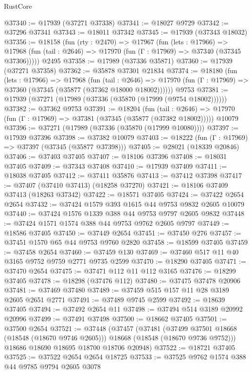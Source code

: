 \begin{lexlean}{RustCore}
\begin{coremodule}
@37340 := @17939 (@37271 @37338)
@37341 := @18027 @9729
@37342 := @37296 @37341
@37343 := @18011 @37342
@37345 := @17939 (@37343 @18032)
@37356 := @18158
    (fun (rty : @2470) =>
    @17967
      (fun (lets : @17966) =>
      @17968 (fun (tail : @2646) => @17970 (fun (Γ : @17969) => @37340 (@37345 @37306)))))
    @2495
@37358 := @17989 (@37336 @35871)
@37360 := @17939 (@37271 @37358)
@37362 := @35878 @37301 @21834
@37374 := @18180
    (fun (lets : @17966) =>
    @17968
      (fun (tail : @2646) =>
      @17970 (fun (Γ : @17969) => @37360 (@37345 (@35877 (@37362 @18000 @18002))))))
    @9753
@37381 := @17939 (@37271 (@17989 (@37336 (@35870 (@17999 (@9754 @18002))))))
@37382 := @37362 @9753
@37391 := @18204
    (fun (tail : @2646) => @17970 (fun (Γ : @17969) => @37381 (@37345 (@35877 (@37382 @18002)))))
    @10079
@37396 := @37271 (@17989 (@37336 (@35870 (@17999 @10080))))
@37397 := @17939 @37396
@37398 := @37382 @10079
@37403 := @18222 (fun (Γ : @17969) => @37397 (@37345 (@35877 @37398)))
@37405 := @28021 (@18339 @20846)
@37406 := @37403 @37405
@37407 := @18106 @37396
@37408 := @18031 @37405
@37409 := @37343 @37408
@37410 := @17939 @37409
@37411 := @18038 @37405
@37412 := @37411 @35876
@37413 := @37412 @37398
@37417 := @37407 (@37410 @37413) (@18258 @37270)
@37421 := @18106 @37409 @37413 (@18263 @37342)
@37422 := @18571 @37405
@37424 := @37422 @2654 @2654
@37432 := @37424 @1579 @393 @1615 @44 @9753 @9832 @2605 @10079
@37440 := @37424 @1576 @1339 @388 @44 @9753 @9797 @2605 @9832
@37448 := @37424 @1571 @1574 @388 @44 @9753 @9762 @2605 @9797
@37449 := @18586 @37405
@37450 := @37449 @2654
@37451 := @37450 @276
@37457 := @37451 @1570 @65 @44 @9753 @9760 @2820
@37458 := @18599 @37405
@37459 := @37458 @2654
@37460 := @37459 @130
@37469 := @37460 @517 @11 @40 @3165 @9752 @9759 @2771 @9735 @2599
@37470 := @18290 @37405
@37471 := @37470 @2654
@37475 := @37471 @112 @11 @112 @3165
@37476 := @18299 @37405
@37478 := @18298 (@37476 @112)
@37480 := @37475 @37478 @20906
@37481 := @37469 @37480
@37489 := @37459 @515 @157 @11 @28 @3189 @2605 @2651 @2771
@37491 := @37489 @9745 @2599
@37492 := @18639 @37405
@37494 := @37492 @2654 @11
@37498 := @37494 @514 @3189 @20992 @20996
@37499 := @37491 @37498
@37500 := @18662 @37405
@37501 := @37500 @2654
@37521 := @37448
    (@37457
      (@37481
        (@37499 @37501 @18668 (@18548 (@18670 @9746 @2605)))
        @18668
        (@18548 (@18670 @9736 @9752)))
      @18686
      @18690
      @18695
      @18700
      @18706
      @20948)
@37522 := @18721 @37405
@37525 := @37522 @2654 @2654 @18725
@37533 := @37525 @9762 @1574 @388 @44 @9785 @9794 @2605 @3078

\end{coremodule}
\end{lexlean}
